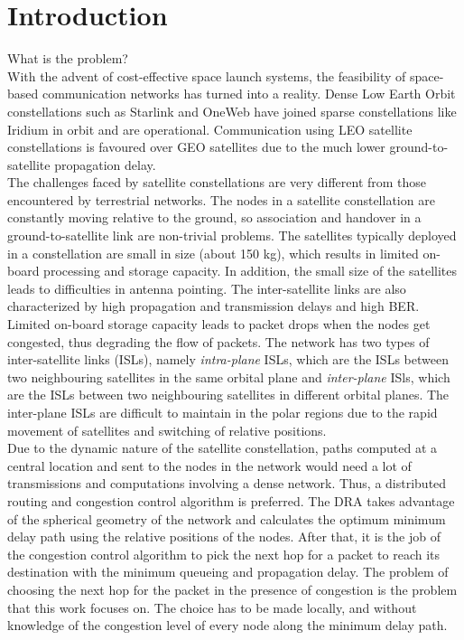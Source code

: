 \documentclass[10pt,conference, draftcls, letterpaper]{IEEEtran}
\newcommand{\rough}[1]{{\color{red} #1}}
\begin{document}
\section{Introduction}
\rough{What is the problem?}\\
With the advent of cost-effective space launch systems, the feasibility of space-based communication networks has turned into a reality. Dense Low Earth Orbit constellations such as Starlink and OneWeb have joined sparse constellations like Iridium in orbit and are operational. Communication using LEO satellite constellations is favoured over GEO satellites due to the much lower ground-to-satellite propagation delay. \\
The challenges faced by satellite constellations are very different from those encountered by terrestrial networks. The nodes in a satellite constellation are constantly moving relative to the ground, so association and handover in a ground-to-satellite link are non-trivial problems. The satellites typically deployed in a constellation are small in size (about 150 kg), which results in limited on-board processing and storage capacity. In addition, the small size of the satellites leads to difficulties in antenna pointing. The inter-satellite links are also characterized by high propagation and transmission delays and high BER. Limited on-board storage capacity leads to packet drops when the nodes get congested, thus degrading the flow of packets. The network has two types of inter-satellite links (ISLs), namely \textit{intra-plane} ISLs, which are the ISLs between two neighbouring satellites in the same orbital plane and \textit{inter-plane} ISls, which are the ISLs between two neighbouring satellites in different orbital planes. The inter-plane ISLs are difficult to maintain in the polar regions due to the rapid movement of satellites and switching of relative positions.\\
Due to the dynamic nature of the satellite constellation, paths computed at a central location and sent to the nodes in the network would need a lot of transmissions and computations involving a dense network. Thus, a distributed routing and congestion control algorithm is preferred. The DRA takes advantage of the spherical geometry of the network and calculates the optimum minimum delay path using the relative positions of the nodes. After that, it is the job of the congestion control algorithm to pick the next hop for a packet to reach its destination with the minimum queueing and propagation delay. The problem of choosing the next hop for the packet in the presence of congestion is the problem that this work focuses on. The choice has to be made locally, and without knowledge of the congestion level of every node along the minimum delay path.\\
\end{document}
